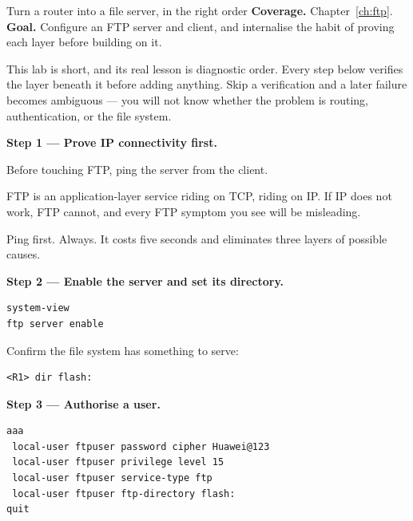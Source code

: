
\begin{labproject}{Turn a router into a file server, in the right order}
\textbf{Coverage.} Chapter~\ref{ch:ftp}.\\
\textbf{Goal.} Configure an FTP server and client, and internalise the habit of proving each layer before building on it.

\begin{labmode}
This lab is short, and its real lesson is diagnostic order. Every step below verifies the layer beneath it before adding anything. Skip a verification and a later failure becomes ambiguous --- you will not know whether the problem is routing, authentication, or the file system.
\end{labmode}

\medskip\noindent\textbf{Step 1 --- Prove IP connectivity first.}\par
Before touching FTP, ping the server from the client.

\begin{keyidea}
FTP is an application-layer service riding on TCP, riding on IP. If IP does not work, FTP cannot, and every FTP symptom you see will be misleading.

Ping first. Always. It costs five seconds and eliminates three layers of possible causes.
\end{keyidea}

\medskip\noindent\textbf{Step 2 --- Enable the server and set its directory.}\par

\begin{lstlisting}[style=utpterminal]
system-view
ftp server enable
\end{lstlisting}

Confirm the file system has something to serve:

\begin{lstlisting}[style=utpterminal]
<R1> dir flash:
\end{lstlisting}

\medskip\noindent\textbf{Step 3 --- Authorise a user.}\par

\begin{lstlisting}[style=utpterminal]
aaa
 local-user ftpuser password cipher Huawei@123
 local-user ftpuser privilege level 15
 local-user ftpuser service-type ftp
 local-user ftpuser ftp-directory flash:
quit
\end{lstlisting}


\end{labproject}
